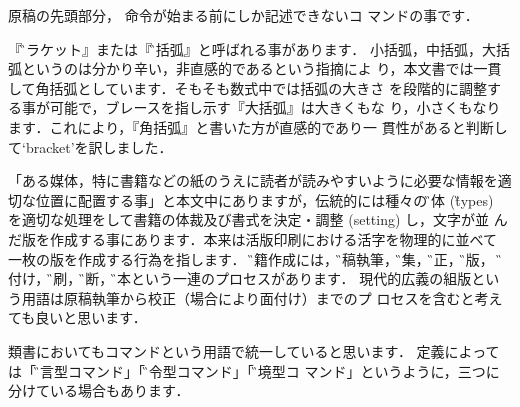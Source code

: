 \begin{description}
原稿の先頭部分， 命令が始まる前にしか記述できないコ
マンドの事です．

\end{description}
\begin{description}
『\G{ブラケット}』または『\G{大括弧}』と呼ばれる事があります．
小括弧，中括弧，大括弧というのは分かり辛い，非直感的であるという指摘によ
り，本文書では一貫して角括弧としています．そもそも数式中では括弧の大きさ
を段階的に調整する事が可能で，ブレースを指し示す『大括弧』は大きくもな
り，小さくもなります．これにより，『角括弧』と書いた方が直感的であり一
貫性があると判断して`bracket'を訳しました．

「ある媒体，特に書籍などの紙のうえに読者が読みやすいように必要な情報を適
切な位置に配置する事」と本文中にありますが，伝統的には種々の\G{書体} (\G{types})
を適切な処理をして書籍の体裁及び書式を決定・調整 (setting) し，文字が並
んだ版を作成する事にあります．本来は活版印刷における活字を物理的に並べて
一枚の版を作成する行為を指します．
\G{書籍作成}には，\G{原稿執筆}，\G{編集}，\G{校正}，\G{組版}，
\G{面付け}，\G{印刷}，\G{裁断}，\G{製本}という一連のプロセスがあります．
現代的広義の組版という用語は原稿執筆から校正（場合により面付け）までのプ
ロセスを含むと考えても良いと思います．

類書においてもコマンドという用語で統一していると思います．
定義によっては「\G{宣言型コマンド}」「\G{命令型コマンド}」「\G{環境型コ
マンド}」というように，三つに分けている場合もあります．

\end{description}

